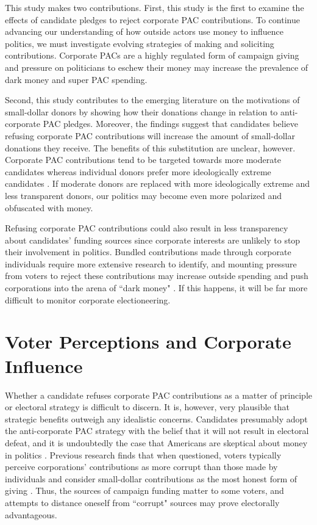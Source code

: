 \documentclass[12pt]{article}
\begin{document}
This study makes two contributions. First, this study is the first to examine the effects of candidate pledges to reject corporate PAC contributions. To continue advancing our understanding of how outside actors use money to influence politics, we must investigate evolving strategies of making and soliciting contributions. Corporate PACs are a highly regulated form of campaign giving and pressure on politicians to eschew their money may increase the prevalence of dark money and super PAC spending.   

Second, this study contributes to the emerging literature on the motivations of small-dollar donors by showing how their donations change in relation to anti-corporate PAC pledges. Moreover, the findings suggest that candidates believe refusing corporate PAC contributions will increase the amount of small-dollar donations they receive. The benefits of this substitution are unclear, however. Corporate PAC contributions tend to be targeted towards more moderate candidates whereas individual donors prefer more ideologically extreme candidates \citep{barber2016}. If moderate donors are replaced with more ideologically extreme and less transparent donors, our politics may become even more polarized and obfuscated with money. 

Refusing corporate PAC contributions could also result in less transparency about candidates' funding sources since corporate interests are unlikely to stop their involvement in politics. Bundled contributions made through corporate individuals require more extensive research to identify, and mounting pressure from voters to reject these contributions may increase outside spending and push corporations into the arena of ``dark money" \citep{opensecrets.org2019, massoglia2021}. If this happens, it will be far more difficult to monitor corporate electioneering.


\section{Voter Perceptions and Corporate Influence}

Whether a candidate refuses corporate PAC contributions as a matter of principle or electoral strategy is difficult to discern. It is, however, very plausible that strategic benefits outweigh any idealistic concerns. Candidates presumably adopt the anti-corporate PAC strategy with the belief that it will not result in electoral defeat, and it is undoubtedly the case that Americans are skeptical about money in politics \citep{lubenow2001}. Previous research finds that when questioned, voters typically perceive corporations' contributions as more corrupt than those made by individuals and consider small-dollar contributions as the most honest form of giving \citep{bowler2016}. Thus, the sources of campaign funding matter to some voters, and attempts to distance oneself from ``corrupt" sources may prove electorally advantageous. 
\end{document}
